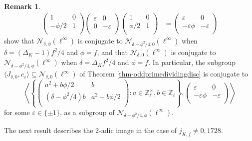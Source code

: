 \documentclass[11pt]{amsart}
\theoremstyle{definition}
\newtheorem{remark}[defn]{Remark}
\newcommand{\Z}{\mathbb{Z}}
\begin{document}
\begin{remark}
\begin{align*}
    \left(\begin{array}{cc}  1 & 0\\ -\phi/2 & 1\\ \end{array}\right)\left(\begin{array}{cc}  \varepsilon & 0\\ 0 & -\varepsilon\\ \end{array}\right) \left(\begin{array}{cc}  1 & 0\\ \phi/2 & 1\\ \end{array}\right) &= \left(\begin{array}{cc}  \varepsilon & 0\\ -\varepsilon\phi  & -\varepsilon \\ \end{array}\right)
    \end{align*}
    show that $\mathcal{N}_{\delta,\phi}(\ell^\infty)$ is conjugate to $\mathcal{N}_{\delta+\phi^2/4,0}(\ell^\infty)$ when $\delta = (\Delta_K -1)f^2/4$ and $\phi = f$, and that $\mathcal{N}_{\delta,0}(\ell^\infty)$ is conjugate to $\mathcal{N}_{\delta-\phi^2/4,\phi}(\ell^\infty)$ when $\delta = \Delta_K f^2/4$ and $\phi = f$. In particular, the subgroup $\langle J_{\delta, 0},c_\varepsilon\rangle\subseteq \mathcal{N}_{\delta,0}(\ell^\infty)$ of Theorem \ref{thm-oddprimedividingdisc} is conjugate to
\[\left\langle \left\{ \left(\begin{array}{cc} a^2+b\phi/2 & b\\ (\delta-\phi^2/4) b & a^2-b\phi/2 \\ \end{array}\right): a \in \Z_\ell^\times, b \in \Z_\ell \right\}, \left(\begin{array}{cc}  \varepsilon & 0\\ -\varepsilon\phi  & -\varepsilon\\ \end{array}\right) \right\rangle\]  
    for some $\varepsilon\in \{\pm 1\}$, as a subgroup of $\mathcal{N}_{\delta-\phi^2/4,\phi}(\ell^\infty)$.
\end{remark}


The next result describes the $2$-adic image in the case of $j_{K,f}\neq 0,1728$.
\end{document}
